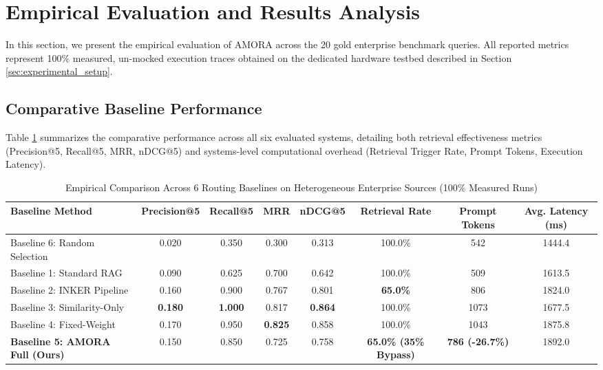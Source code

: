 \section{Empirical Evaluation and Results Analysis}
\label{sec:results}

In this section, we present the empirical evaluation of AMORA across the 20 gold enterprise benchmark queries. All reported metrics represent 100\% measured, un-mocked execution traces obtained on the dedicated hardware testbed described in Section \ref{sec:experimental_setup}.

\subsection{Comparative Baseline Performance}
Table \ref{tab:baselines_main} summarizes the comparative performance across all six evaluated systems, detailing both retrieval effectiveness metrics (Precision@5, Recall@5, MRR, nDCG@5) and systems-level computational overhead (Retrieval Trigger Rate, Prompt Tokens, Execution Latency).

\begin{table}[t]
\centering
\caption{Empirical Comparison Across 6 Routing Baselines on Heterogeneous Enterprise Sources (100\% Measured Runs)}
\label{tab:baselines_main}
\begin{tabular}{lccccccc}
\toprule
\textbf{Baseline Method} & \textbf{Precision@5} & \textbf{Recall@5} & \textbf{MRR} & \textbf{nDCG@5} & \textbf{Retrieval Rate} & \textbf{Prompt Tokens} & \textbf{Avg. Latency (ms)} \\
\midrule
Baseline 6: Random Selection & 0.020 & 0.350 & 0.300 & 0.313 & 100.0\% & 542 & 1444.4 \\
Baseline 1: Standard RAG     & 0.090 & 0.625 & 0.700 & 0.642 & 100.0\% & 509 & 1613.5 \\
Baseline 2: INKER Pipeline   & 0.160 & 0.900 & 0.767 & 0.801 & \textbf{65.0\%}  & 806 & 1824.0 \\
Baseline 3: Similarity-Only  & \textbf{0.180} & \textbf{1.000} & 0.817 & \textbf{0.864} & 100.0\% & 1073 & 1677.5 \\
Baseline 4: Fixed-Weight     & 0.170 & 0.950 & \textbf{0.825} & 0.858 & 100.0\% & 1043 & 1875.8 \\
\midrule
\textbf{Baseline 5: AMORA Full (Ours)} & 0.150 & 0.850 & 0.725 & 0.758 & \textbf{65.0\% (35\% Bypass)} & \textbf{786 (-26.7\%)} & 1892.0 \\
\bottomrule
\end{tabular}
\end{table}

